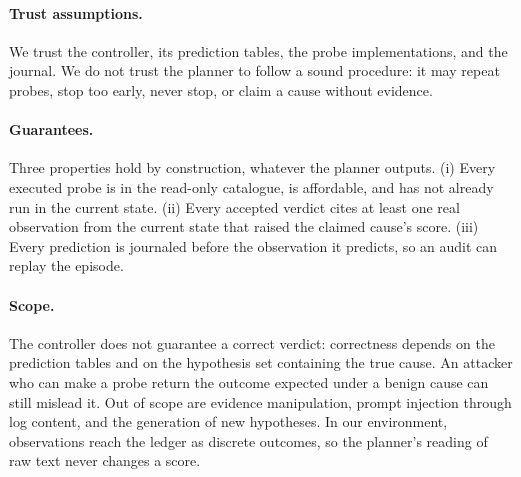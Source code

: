 \paragraph{Trust assumptions.} We trust the controller, its prediction tables, the probe implementations, and the journal. We do not trust the planner to follow a sound procedure: it may repeat probes, stop too early, never stop, or claim a cause without evidence.

\paragraph{Guarantees.} Three properties hold by construction, whatever the planner outputs. (i) Every executed probe is in the read-only catalogue, is affordable, and has not already run in the current state. (ii) Every accepted verdict cites at least one real observation from the current state that raised the claimed cause's score. (iii) Every prediction is journaled before the observation it predicts, so an audit can replay the episode.

\paragraph{Scope.} The controller does not guarantee a correct verdict: correctness depends on the prediction tables and on the hypothesis set containing the true cause. An attacker who can make a probe return the outcome expected under a benign cause can still mislead it. Out of scope are evidence manipulation, prompt injection through log content, and the generation of new hypotheses. In our environment, observations reach the ledger as discrete outcomes, so the planner's reading of raw text never changes a score.
